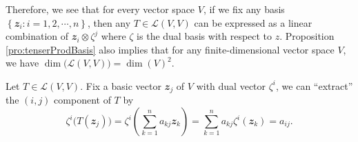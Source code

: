 \documentclass[math, code]{amznotes}
\theoremstyle{remark}
\begin{document}
Therefore, we see that for every vector space $V$, if we fix any basis $\left\{\mathbfit{z}_i \colon i = 1, 2, \cdots, n\right\}$, then any $T \in \mathcal{L}(V, V)$ can be expressed as a linear combination of $\mathbfit{z}_i \otimes \zeta^j$ where $\zeta$ is the dual basis with respect to $z$. Proposition \ref{pro:tenserProdBasis} also implies that for any finite-dimensional vector space $V$, we have $\dim\bigl(\mathcal{L}(V, V)\bigr) = \dim(V)^2$.

Let $T \in \mathcal{L}(V, V)$. Fix a basic vector $\mathbfit{z}_j$ of $V$ with dual vector $\zeta^i$, we can ``extract'' the $(i, j)$ component of $T$ by
\begin{equation*}
    \zeta^i\bigl(T(\mathbfit{z}_j)\bigr) = \zeta^i\left(\sum_{k = 1}^{n}a_{kj}\mathbfit{z}_k\right) = \sum_{k = 1}^{n}a_{kj}\zeta^i(\mathbfit{z}_k) = a_{ij}.
\end{equation*}
\end{document}
